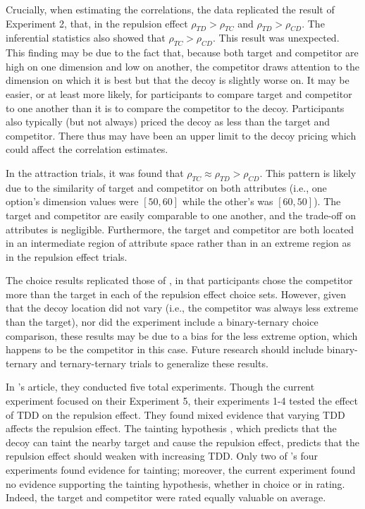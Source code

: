 Crucially, when estimating the correlations, the data replicated the result of Experiment 2, that, in the repulsion effect $\rho_{TD}>\rho_{TC}$ and $\rho_{TD}>\rho_{CD}$. The inferential statistics also showed that $\rho_{TC}>\rho_{CD}$. This result was unexpected. This finding may be due to the fact that, because both target and competitor are high on one dimension and low on another, the competitor draws attention to the dimension on which it is best but that the decoy is slightly worse on. It may be easier, or at least more likely, for participants to compare target and competitor to one another than it is to compare the competitor to the decoy. Participants also typically (but not always) priced the decoy as less than the target and competitor. There thus may have been an upper limit to the decoy pricing which could affect the correlation estimates. 

In the attraction trials, it was found that $\rho_{TC}\approx\rho_{TD}>\rho_{CD}$. This pattern is likely due to the similarity of target and competitor on both attributes (i.e., one option's dimension values were $[50,60]$ while the other's was $[60,50]$). The target and competitor are easily comparable to one another, and the trade-off on attributes is negligible. Furthermore, the target and competitor are both located in an intermediate region of attribute space rather than in an extreme region as in the repulsion effect trials.

The choice results replicated those of \textcite{banerjeeFactorsThatPromote2024}, in that participants chose the competitor more than the target in each of the repulsion effect choice sets. However, given that the decoy location did not vary (i.e., the competitor was always less extreme than the target), nor did the experiment include a binary-ternary choice comparison, these results may be due to a bias for the less extreme option, which happens to be the competitor in this case. Future research should include binary-ternary and ternary-ternary trials to generalize these results.

In \textcite{banerjeeFactorsThatPromote2024}'s article, they conducted five total experiments. Though the current experiment focused on their Experiment 5, their experiments 1-4 tested the effect of TDD on the repulsion effect. They found mixed evidence that varying TDD affects the repulsion effect. The tainting hypothesis \textcite{frederick2008attraction}, which predicts that the decoy can taint the nearby target and cause the repulsion effect, predicts that the repulsion effect should weaken with increasing TDD. Only two of \textcite{banerjeeFactorsThatPromote2024}'s four experiments found evidence for tainting; moreover, the current experiment found no evidence supporting the tainting hypothesis, whether in choice or in rating. Indeed, the target and competitor were rated equally valuable on average.

